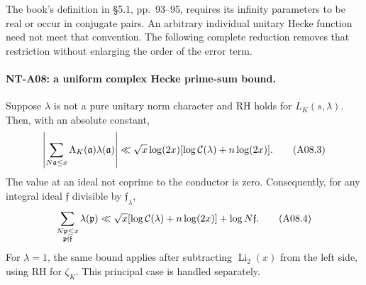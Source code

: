 The book's definition in \S5.1, pp.~93--95, requires its infinity
parameters to be real or occur in conjugate pairs. An arbitrary
individual unitary Hecke function need not meet that convention.
The following complete reduction removes that restriction without
enlarging the order of the error term.

\paragraph{NT-A08: a uniform complex Hecke prime-sum bound.}
Suppose \(\lambda\) is not a pure unitary norm character and
RH holds for \(L_K(s,\lambda)\). Then, with an absolute constant,
\[
 \left|\sum_{N\mathfrak a\le x}
       \Lambda_K(\mathfrak a)\lambda(\mathfrak a)\right|
 \ll \sqrt x\log(2x)
          [\log{\cal C}(\lambda)+n\log(2x)].             \tag{A08.3}
\]
The value at an ideal not coprime to the conductor is zero.
Consequently, for any integral ideal \(\mathfrak f\) divisible by
\(\mathfrak f_\lambda\),
\[
 \sum_{\substack{N\mathfrak p\le x\\\mathfrak p\nmid\mathfrak f}}
            \lambda(\mathfrak p)
 \ll \sqrt x[\log{\cal C}(\lambda)+n\log(2x)]
                       +\log N\mathfrak f.             \tag{A08.4}
\]
For \(\lambda=1\), the same bound applies after subtracting
\(\operatorname{Li}_2(x)\) from the left side, using RH for
\(\zeta_K\). This principal case is handled separately.

